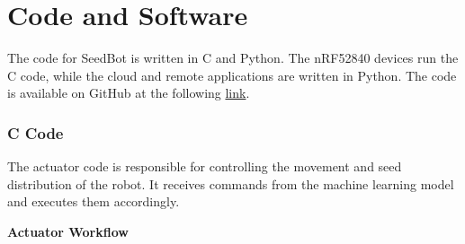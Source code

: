 \chapter{Code and Software}

The code for SeedBot is written in C and Python. The nRF52840 devices run the C code, while the cloud and remote applications are written in Python. The code is available on GitHub at the following \href {https://github.com/}{link}.



\subsection{C Code}



The actuator code is responsible for controlling the movement and seed distribution of the robot. It receives commands from the machine learning model and executes them accordingly.


\textbf{Actuator Workflow}

